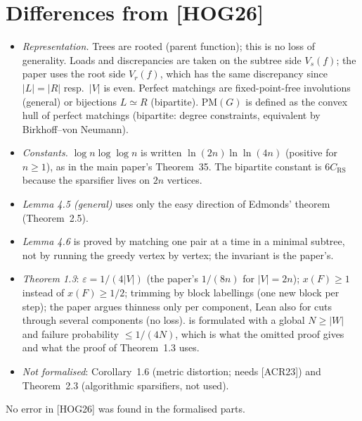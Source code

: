 \section{Differences from [HOG26]}
\begin{itemize}
\item \emph{Representation.} Trees are rooted (parent function); this is no loss of generality. Loads and
  discrepancies are taken on the subtree side $V_s(f)$; the paper uses the root side $V_r(f)$, which has the same
  discrepancy since $|L|=|R|$ resp.\ $|V|$ is even. Perfect matchings are fixed-point-free involutions (general)
  or bijections $L\simeq R$ (bipartite). $\mathrm{PM}(G)$ is defined as the convex hull of perfect matchings
  (bipartite: degree constraints, equivalent by Birkhoff--von Neumann).
\item \emph{Constants.} $\log n\log\log n$ is written $\ln(2n)\ln\ln(4n)$ (positive for $n\ge1$), as in the main
  paper's Theorem~35. The bipartite constant is $6C_{\mathrm{RS}}$ because the sparsifier lives on $2n$ vertices.
\item \emph{Lemma 4.5 (general)} uses only the easy direction of Edmonds' theorem (Theorem~2.5).
\item \emph{Lemma 4.6} is proved by matching one pair at a time in a minimal subtree, not by running the greedy
  vertex by vertex; the invariant is the paper's.
\item \emph{Theorem 1.3}: $\varepsilon=1/(4|V|)$ (the paper's $1/(8n)$ for $|V|=2n$); $x(F)\ge1$ instead of
  $x(F)\ge1/2$; trimming by block labellings (one new block per step); the paper argues thinness only per
  component, Lean also for cuts through several components (no loss).  is formulated with a global
  $N\ge|W|$ and failure probability $\le1/(4N)$, which is what the omitted proof gives and what the proof of
  Theorem~1.3 uses.
\item \emph{Not formalised}: Corollary~1.6 (metric distortion; needs [ACR23]) and Theorem~2.3 (algorithmic
  sparsifiers, not used).
\end{itemize}
No error in [HOG26] was found in the formalised parts.

